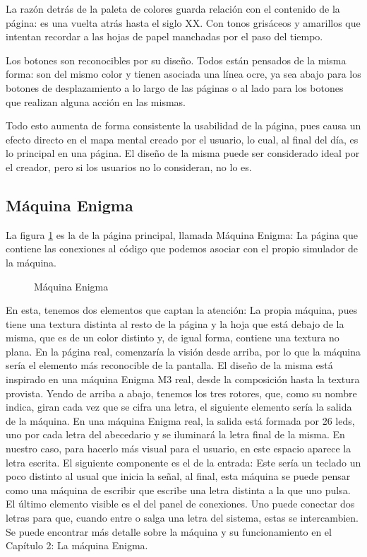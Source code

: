 La razón detrás de la paleta de colores guarda relación con el contenido de la página: es una vuelta atrás hasta el siglo XX. Con tonos grisáceos y amarillos que intentan recordar a las hojas de papel manchadas por el paso del tiempo.

Los botones son reconocibles por su diseño. Todos están pensados de la misma forma: son del mismo color y tienen asociada una línea ocre, ya sea abajo para los botones de desplazamiento a lo largo de las páginas o al lado para los botones que realizan alguna acción en las mismas. 

Todo esto aumenta de forma consistente la usabilidad de la página, pues causa un efecto directo en el mapa mental creado por el usuario, lo cual, al final del día, es lo principal en una página. El diseño de la misma puede ser considerado ideal por el creador, pero si los usuarios no lo consideran, no lo es.


\subsection{Máquina Enigma}

La figura \ref{pagina_principal} es la de la página principal, llamada Máquina Enigma: La página que contiene las conexiones al código que podemos asociar con el propio simulador de la máquina.

\begin{figure}[htbp]
	\centerline{}
	\caption{Máquina Enigma}
	\label{pagina_principal}
\end{figure}

En esta, tenemos dos elementos que captan la atención: La propia máquina, pues tiene una textura distinta al resto de la página y la hoja que está debajo de la misma, que es de un color distinto y, de igual forma, contiene una textura no plana.  En la página real, comenzaría la visión desde arriba, por lo que la máquina sería el elemento más reconocible de la pantalla. El diseño de la misma está inspirado en una máquina Enigma M3 real, desde la composición hasta la textura provista. Yendo de arriba a abajo, tenemos los tres rotores, que, como su nombre indica, giran cada vez que se cifra una letra, el siguiente elemento sería la salida de la máquina. En una máquina Enigma real, la salida está formada por 26 leds, uno por cada letra del abecedario y se iluminará la letra final de la misma. En nuestro caso, para hacerlo más visual para el usuario, en este espacio aparece la letra escrita. El siguiente componente es el de la entrada: Este sería un teclado un poco distinto al usual que inicia la señal, al final, esta máquina se puede pensar como una máquina de escribir que escribe una letra distinta a la que uno pulsa. El último elemento visible es el del panel de conexiones. Uno puede conectar dos letras para que, cuando entre o salga una letra del sistema, estas se intercambien. Se puede encontrar más detalle sobre la máquina y su funcionamiento en el Capítulo 2: La máquina Enigma.

